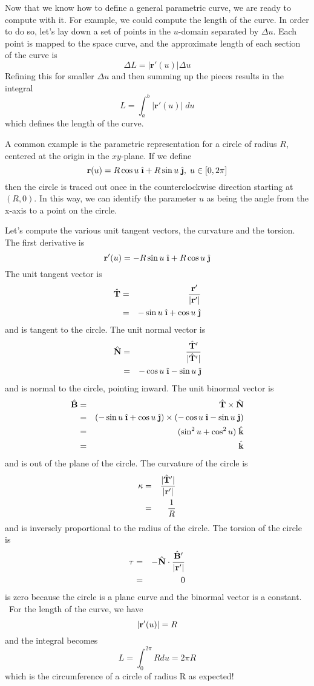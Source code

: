 \documentclass[M3_Night1_Solutions]{subfiles}
\begin{document}
Now that we know how to define a general parametric curve, we are ready to compute with it. For example, we could compute the length of the curve. In order to do so, let's lay down a set of points in the $u$-domain separated by $\Delta u$. Each point is mapped to the space curve, and the approximate length of each section of the curve is
\[ \Delta L = |\mathbf{r}'(u)| \Delta u \]
Refining this for smaller $\Delta u$ and then summing up the pieces results in the integral
\[ L = \int_a^b |\mathbf{r}'(u)| \; du \]
which defines the length of the curve.

A common example is the parametric representation for a circle of radius $R$, centered at the origin in the $xy$-plane. If we define
\[ \r(u) = R \cos u \; \ihat + R \sin u \; \jhat, \; u \in [0,2 \pi] \]
then the circle is traced out once in the counterclockwise direction starting at $(R,0)$. In this way, we can identify the parameter $u$ as being the angle from the x-axis to a point on the circle.

Let's compute the various unit tangent vectors, the curvature and the torsion. The first derivative is
\[\r'(u) = -R \sin u \; \ihat + R \cos u \; \jhat \]
The unit tangent vector is
\begin{eqnarray*}
\That &=& \frac{\r'}{|\r'|}  \\
&=& - \sin u \; \ihat + \cos u \; \jhat
\end{eqnarray*}
and is tangent to the circle. The unit normal vector is
\begin{eqnarray*}
\Nhat &=&   \frac{\That'}{|\That'|} \\
&=& -\cos u \; \ihat - \sin u \; \jhat
\end{eqnarray*}
and is normal to the circle, pointing inward. The unit binormal vector is
\begin{eqnarray*}
\Bhat &=&  \That \times \Nhat \\
&=& (- \sin u \; \ihat + \cos u \; \jhat) \times (-\cos u \; \ihat - \sin u \; \jhat) \\
&=& (\sin^2 u + \cos^2 u) \; \khat \\
&=& \khat
\end{eqnarray*}
and is out of the plane of the circle. The curvature of the circle is
\begin{eqnarray*}
 \kappa &=& \frac{|\hat{\mathbf{T}}'|}{|\mathbf{r}'|} \\
 &=& \frac{1}{R}
 \end{eqnarray*}
and is inversely proportional to the radius of the circle. The torsion of the circle is
\begin{eqnarray*}
\tau &=& -\hat{\mathbf{N}} \cdot \frac{\hat{\mathbf{B}}'}{|\mathbf{r}'|} \\
&=& 0
\end{eqnarray*}
is zero because the circle is a plane curve and the binormal vector is a constant.
\
For the length of the curve, we have
\[|\mathbf{r}'(u)| =  R \]
and the integral becomes
\[L = \int_0^{2 \pi} R du = 2 \pi R \]
which is the circumference of a circle of radius R as expected!
\end{document}
